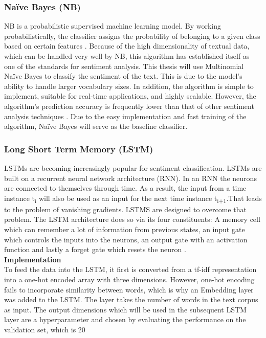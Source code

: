 \documentclass[11pt, a4paper]{article}
\begin{document}
\subsubsection{Naïve Bayes (NB)} \label{subs:naivebayes}
NB is a probabilistic supervised machine learning model. By working probabilistically, the classifier assigns the probability of 
belonging to a given class based on certain features \citep{jemai2021SentimentAnalysis}. Because of the high dimensionality of textual data, 
which can be handled very well by NB, this algorithm has established itself as one of the standards for sentiment analysis. 
This thesis will use Multinomial Naïve Bayes to classify the sentiment of the text. This is due to the model’s ability to handle 
larger vocabulary sizes. In addition, the algorithm is simple to implement, suitable for real-time applications, and highly scalable. 
However, the algorithm’s prediction accuracy is frequently lower than that of other sentiment analysis techniques \citep{song2017novelclassification}. 
Due to the easy implementation and fast training of the algorithm, Naïve Bayes will serve as the baseline classifier.

\subsubsection{Long Short Term Memory (LSTM)} \label{subs:lstm}
LSTMs are becoming increasingly popular for sentiment classification. 
LSTMs are built on a recurrent neural network architecture (RNN). In an RNN the neurons are connected to themselves through time. 
As a result, the input from a time instance t\textsubscript{i} will also be used as an input for the next time instance t\textsubscript{i+1}.That leads to the 
problem of vanishing gradients. LSTMS are designed to overcome that problem.
The LSTM architecture does so via its four constituents: A memory cell which can remember a lot of information 
from previous states, an input gate which controls the inputs into the neurons, an output gate with an activation function 
and lastly a forget gate which resets the neuron \citep{priyantina2019sentimentanalysishotel}. \\


\noindent\textbf{Implementation}\\
To feed the data into the LSTM, it first is converted from a tf-idf representation into a one-hot encoded array with three dimensions. However, one-hot encoding fails to incorporate similarity between words, which is why an Embedding layer was added to the LSTM. The layer takes the number of words in the text corpus as input. The output dimensions which will be used in the subsequent LSTM layer are a hyperparameter and chosen by evaluating the performance on the validation set, which is 20%
\end{document}
